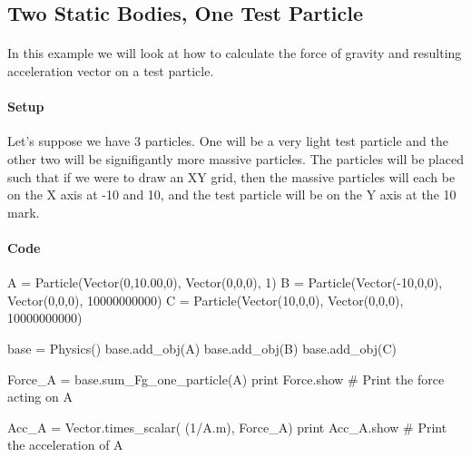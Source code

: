 \documentclass[15pt]{report}
\begin{document}
\subsection{Two Static Bodies, One Test Particle}
\paragraph{} In this example we will look at how to calculate  the force of gravity and resulting acceleration vector on a test particle.

\paragraph{Setup} Let's suppose we have 3 particles. One will be a very light test particle and the other two will be signifigantly more 
massive particles. The particles will be placed such that if we were to draw an XY grid, then the massive particles will each be on the 
X axis at -10 and 10, and the test particle will be on the Y axis at the 10 mark. 
\paragraph{Code}

\begin{code}
	A = Particle(Vector(0,10.00,0), Vector(0,0,0), 1)
	B = Particle(Vector(-10,0,0), Vector(0,0,0), 10000000000)
	C = Particle(Vector(10,0,0), Vector(0,0,0), 10000000000)

	base = Physics()
	base.add_obj(A)
	base.add_obj(B)
	base.add_obj(C)

	Force_A = base.sum_Fg_one_particle(A)
	print Force.show                    # Print the force acting on A

	Acc_A = Vector.times_scalar( (1/A.m), Force_A) 
	print Acc_A.show                    # Print the acceleration of A

\end{code}

\printbibliography
\end{document}
